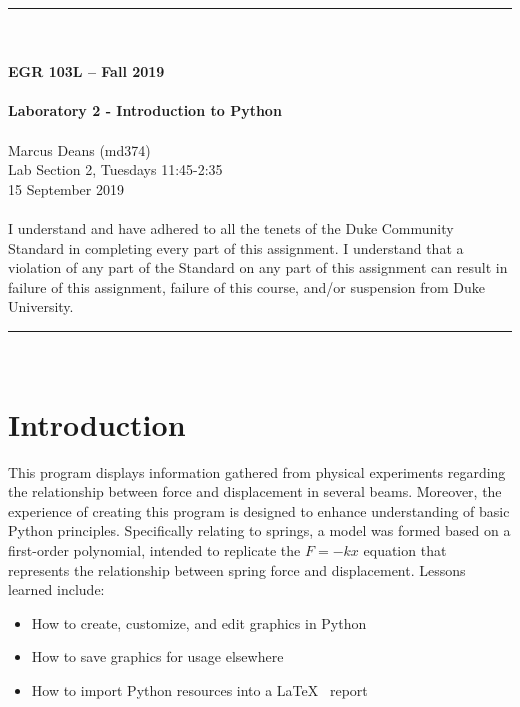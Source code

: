 \documentclass{article}
\begin{document}
\begin{center}
\rule{6.5in}{0.5mm}\\~\\
\textbf{\large EGR 103L -- Fall 2019}\\~\\
\textbf{\huge Laboratory 2 - Introduction to Python}\\~\\
Marcus Deans (md374)\\
Lab Section 2, Tuesdays 11:45-2:35\\
15 September 2019\\~\\
{\small I understand and have adhered to all the tenets of the Duke
  Community Standard in completing every part of this assignment.  I
  understand that a violation of any part of the Standard on any part
  of this assignment can result in failure of this assignment, failure
  of this course, and/or suspension from Duke University.} 
\rule{6.5in}{0.5mm}\\
\end{center}
\tableofcontents
\listoffigures
\pagebreak

\section{Introduction}
This program displays information gathered from physical experiments regarding the relationship between force and displacement in several beams. Moreover, the experience of creating this program is designed to enhance understanding of basic Python principles. Specifically relating to springs, a model was formed based on a first-order polynomial, intended to replicate the $F=-kx$ equation that represents the relationship between spring force and displacement.
Lessons learned include:
\begin{itemize}
  \item How to create, customize, and edit graphics in Python
  \item How to save graphics for usage elsewhere
  \item How to import Python resources into a \LaTeX~ report
\end{itemize}
\end{document}

